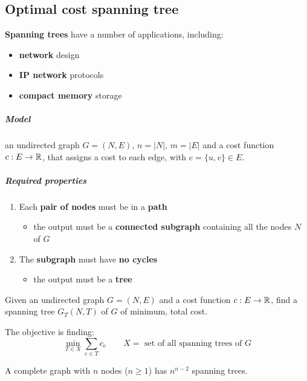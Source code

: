 \documentclass[english]{article}
\begin{document}
\newpage

\subsection{Optimal cost spanning tree}

\textbf{Spanning trees} have a number of applications, including:

\begin{itemize}
  \item \textbf{network} design
  \item \textbf{IP network} protocols
  \item \textbf{compact memory} storage
\end{itemize}

\subparagraph*{Model}
an undirected graph \(G = (N, E), \, n = |N|, \, m = |E|\) and a cost function \(c: E \rightarrow \mathbb{R}\), that assigns a cost to each edge, with \(e = \{u, v\} \in E\).

\subparagraph*{Required properties}
\begin{enumerate}
  \item Each \textbf{pair of nodes} must be in a \textbf{path}
        \begin{itemize}[label= \(\Rightarrow\)]
          \item the output must be a \textbf{connected subgraph} containing all the nodes \(N\) of \(G\)
        \end{itemize}
  \item The \textbf{subgraph} must have \textbf{no cycles}
        \begin{itemize}[label= \(\Rightarrow\)]
          \item the output must be a \textbf{tree}
        \end{itemize}
\end{enumerate}

\bigskip
\begin{problem}
Given an undirected graph \(G = (N, E)\) and a cost function \(c: E \rightarrow \mathbb{R}\), find a spanning tree \(G_T(N, T)\) of \(G\) of minimum, total cost.

The objective is finding:
\[ \displaystyle \min_{T \in X} \sum_{e \in T} c_e \qquad X = \text{ set of all spanning trees of } G \]
\end{problem}

\begin{theorem}
  A complete graph with \(n\) nodes (\(n \geq 1\)) has \(n^{n-2}\) spanning trees.
\end{theorem}
\end{document}
